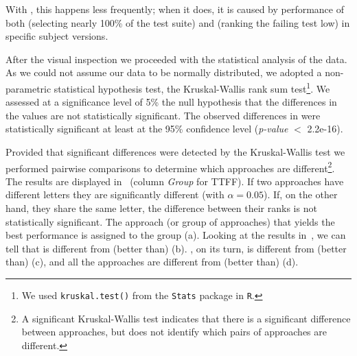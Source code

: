 With \fz, this happens less frequently; when it does, it is caused by performance of both \ek (selecting nearly 100\% of the test suite) and \fs (ranking the failing test low) in specific subject versions.

After the visual inspection we proceeded with the statistical analysis of the data. 
As we could not assume our data to be normally distributed, we adopted a non-parametric statistical hypothesis test, 
the Kruskal-Wallis rank sum test\footnote{We used \texttt{kruskal.test()} from the \texttt{Stats} package in \texttt{R}.}.
We assessed at a significance level of 5\% the null hypothesis that the differences in the \ttff values are not statistically significant.
The observed differences in \ttff were statistically significant at least at the 95\% confidence level 
(\textit{p-value} $<$ 2.2e-16).

Provided that significant differences were detected by the
Kruskal-Wallis test we performed pairwise comparisons to
determine which approaches are different\footnote{A significant Kruskal-Wallis test indicates that 
there is a significant difference between approaches, 
but does not identify which pairs of approaches are different.}. 
The results are displayed in~ (column \textit{Group} for TTFF).
If two approaches have different letters they are significantly different
(with $\alpha = 0.05$). If, on the other hand, they share the same letter, the
difference between their ranks is not statistically significant. 
The approach (or group of approaches) that yields the best performance is
assigned to the group (a).
Looking at the results in~, we can tell that
\fz is different from (better than) \ekr (b).
\ekr, on its turn, is different from (better than) \fs (c), 
and all the approaches are different from (better than) \rnd (d).






